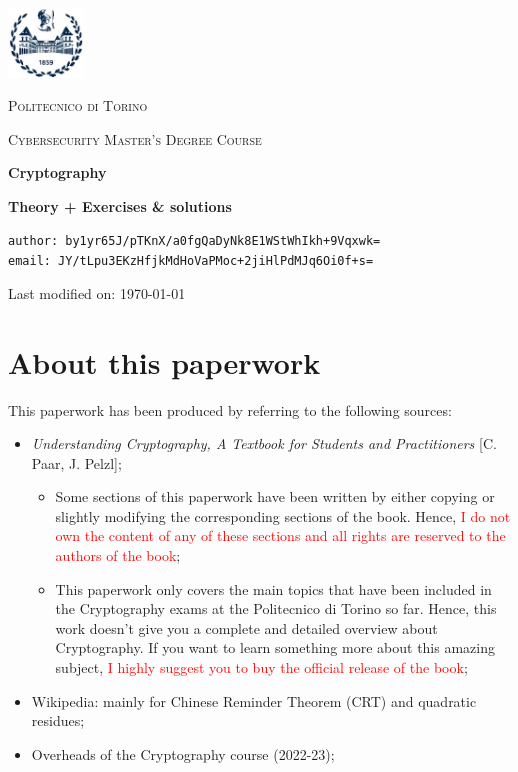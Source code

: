 \documentclass[11pt, a4paper]{article}
\author{Andrea Caruso}
\date{\today}
\begin{document}
\begin{titlepage}
	\centering
	\includegraphics[width=0.15\textwidth]{utili/PoliTo logo.jpg}\par\vspace{1cm}
	{\scshape\LARGE Politecnico di Torino \par}
	\vspace{1cm}
	{\scshape\Large Cybersecurity Master's Degree Course\par}
	\vspace{6cm}
	{\huge\bfseries Cryptography\par}
	\vspace{0.6cm}
	{\large\bfseries Theory + Exercises \& solutions\par}
	\vfill
    {\texttt{author: by1yr65J/pTKnX/a0fgQaDyNk8E1WStWhIkh+9Vqxwk=}\\\texttt{email: JY/tLpu3EKzHfjkMdHoVaPMoc+2jiHlPdMJq6Oi0f+s=}\\\vspace{0.5cm}\large{Last modified on: \today\par}}
\end{titlepage}

\newpage
\section*{About this paperwork}
This paperwork has been produced by referring to the following sources:
\begin{itemize}
    \item \textit{Understanding Cryptography, A Textbook for Students and Practitioners} [C. Paar, J. Pelzl];
    \begin{itemize}
        \item Some sections of this paperwork have been written by either copying or slightly modifying the corresponding sections of the book. Hence, \textcolor{red}{I do not own the content of any of these sections and all rights are reserved to the authors of the book};
        \item This paperwork only covers the main topics that have been included in the Cryptography exams at the Politecnico di Torino so far. Hence, this work doesn't give you a complete and detailed overview about Cryptography. If you want to learn something more about this amazing subject, \textcolor{red}{I highly suggest you to buy the official release of the book};
    \end{itemize}
    \item Wikipedia: mainly for Chinese Reminder Theorem (CRT) and quadratic residues;
    \item Overheads of the Cryptography course (2022-23);
\end{itemize}
\end{document}
